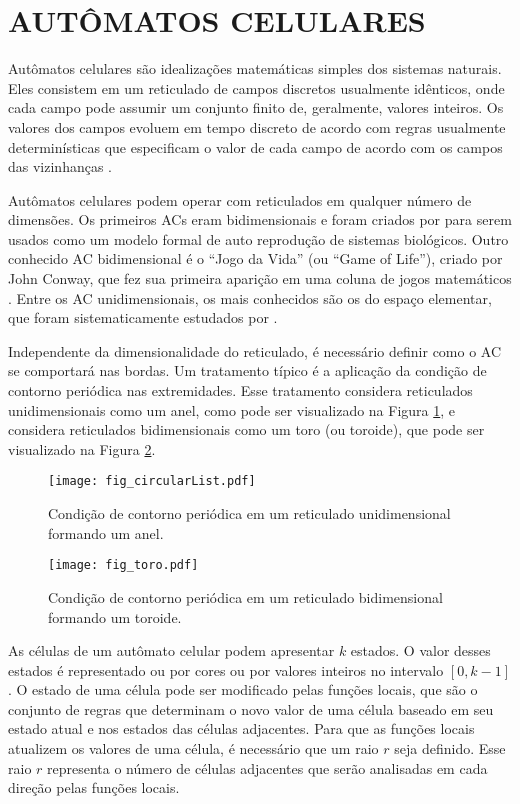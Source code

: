 \section{AUTÔMATOS CELULARES}
\label{sec:acs}
Autômatos celulares são idealizações matemáticas simples dos sistemas naturais. Eles consistem em um reticulado de campos discretos usualmente idênticos, onde cada campo pode assumir um conjunto finito de, geralmente, valores inteiros. Os valores dos campos evoluem em tempo discreto de acordo com regras usualmente determinísticas que especificam o valor de cada campo de acordo com os campos das vizinhanças \cite{wolfram1994cellular}.


Autômatos celulares podem operar com reticulados em qualquer número de dimensões. Os primeiros ACs eram bidimensionais e foram criados por  para serem usados como um modelo formal de auto reprodução de sistemas biológicos. Outro conhecido AC bidimensional é o ``Jogo da Vida'' (ou ``Game of Life''), criado por John Conway, que fez sua primeira aparição em uma coluna de jogos matemáticos \cite{GardnerM1970}. Entre os AC unidimensionais, os mais conhecidos são os do espaço elementar, que foram sistematicamente estudados por .

Independente da dimensionalidade do reticulado, é necessário definir como o AC se comportará nas bordas. Um tratamento típico é a aplicação da condição de contorno periódica nas extremidades. Esse tratamento considera reticulados unidimensionais como um anel, como pode ser visualizado na Figura \ref{fig:anel}, e considera reticulados bidimensionais como um toro (ou toroide), que pode ser visualizado na Figura \ref{fig:toro}.  
	\begin{figure}[h!]
	  \centering
	  \texttt{[image: fig\_circularList.pdf]}
	  \caption{Condição de contorno periódica em um reticulado unidimensional formando um anel.}
	  \label{fig:anel}
	\end{figure}

	\begin{figure}[h!]
	  \centering
  	  \texttt{[image: fig\_toro.pdf]}
	  \caption{Condição de contorno periódica em um reticulado bidimensional formando um toroide.}
	  \label{fig:toro}
	\end{figure}

As células de um autômato celular podem apresentar $k$ estados. O valor desses estados é representado ou por cores ou por valores inteiros no intervalo $[0, k-1]$. O estado de uma célula pode ser modificado pelas funções locais, que são o conjunto de regras que determinam o novo valor de uma célula baseado em seu estado atual e nos estados das células adjacentes. Para que as funções locais atualizem os valores de uma célula, é necessário que um raio $r$ seja definido. Esse raio $r$ representa o número de células adjacentes que serão analisadas em cada direção pelas funções locais.


